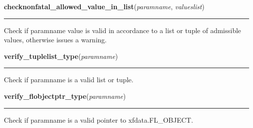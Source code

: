     \label{xformslib:library:checknonfatal_allowed_value_in_list}

    \vspace{0.5ex}

\hspace{.8\funcindent}\begin{boxedminipage}{\funcwidth}

    \raggedright \textbf{checknonfatal\_allowed\_value\_in\_list}(\textit{paramname}, \textit{valueslist})

    \vspace{-1.5ex}

    \rule{\textwidth}{0.5\fboxrule}
\setlength{\parskip}{2ex}

Check if paramname value is valid in accordance to a list or tuple
of admissible values, otherwise issues a warning.
\setlength{\parskip}{1ex}
    \end{boxedminipage}

    \label{xformslib:library:verify_tuplelist_type}

    \vspace{0.5ex}

\hspace{.8\funcindent}\begin{boxedminipage}{\funcwidth}

    \raggedright \textbf{verify\_tuplelist\_type}(\textit{paramname})

    \vspace{-1.5ex}

    \rule{\textwidth}{0.5\fboxrule}
\setlength{\parskip}{2ex}

Check if paramname is a valid list or tuple.
\setlength{\parskip}{1ex}
    \end{boxedminipage}

    \label{xformslib:library:verify_flobjectptr_type}

    \vspace{0.5ex}

\hspace{.8\funcindent}\begin{boxedminipage}{\funcwidth}

    \raggedright \textbf{verify\_flobjectptr\_type}(\textit{paramname})

    \vspace{-1.5ex}

    \rule{\textwidth}{0.5\fboxrule}
\setlength{\parskip}{2ex}

Check if paramname is a valid pointer to xfdata.FL\_OBJECT.
\setlength{\parskip}{1ex}
    \end{boxedminipage}

